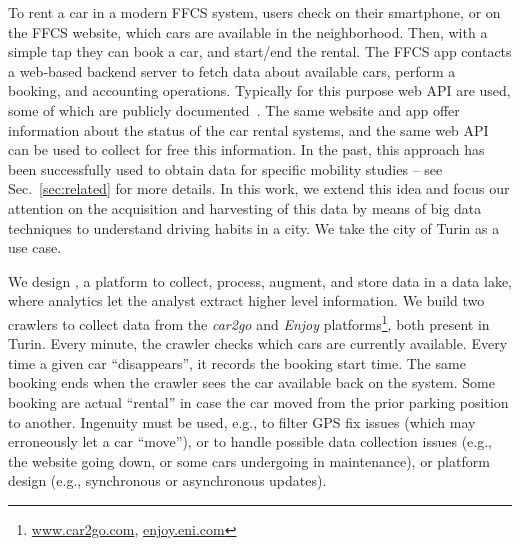 %
To rent a car in a modern FFCS system, users check on their smartphone, or on the FFCS website, which cars are available in the neighborhood. Then, with a simple tap they can book a car, and start/end the rental. The FFCS app contacts a web-based backend server to fetch data about available cars, perform a booking, and accounting operations. Typically for this purpose web API are used, some of which are publicly documented~\cite{car2goAPI}. The same website and app offer information about the status of the car rental systems, and the same web API can be used to collect for free this information. In the past, this approach has been successfully used to obtain data for specific mobility studies -- see Sec.~\ref{sec:related} for more details.
In this work, we extend this idea and focus our attention on the acquisition and harvesting of this data by means of big data techniques to understand driving habits in a city. We take the city of Turin as a use case.

We design \tool, a platform to collect, process, augment, and store data in a data lake, where analytics let the analyst extract higher level information.
We build two crawlers to collect data from the \textit{car2go}  and \textit{Enjoy} platforms\footnote{\url{www.car2go.com}, \url{enjoy.eni.com}}, both present in Turin. Every minute, the crawler checks which cars are currently available. Every time a given car ``disappears'', it records the booking start time. The same booking ends when the crawler sees the car available back on the system. Some booking are actual ``rental'' in case the car moved from the prior parking position to another. Ingenuity must be used, e.g., to filter GPS fix issues (which may erroneously let a car ``move''), or to handle possible data collection issues (e.g., the website going down, or some cars undergoing in maintenance), or platform design (e.g., synchronous or asynchronous updates).

